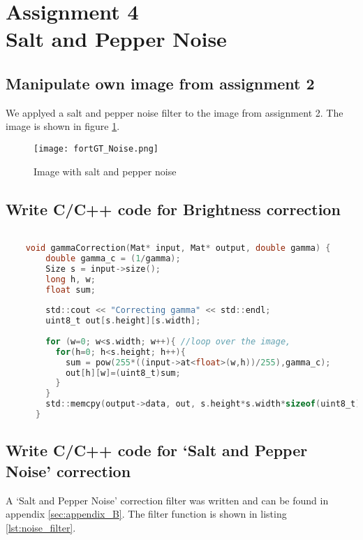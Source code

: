 \section {Assignment 4 \\ {Salt and Pepper Noise}}
\label {sec:assignment_4}

\subsection{Manipulate own image from assignment 2}

We applyed a salt and pepper noise filter to the image from assignment 2. The image is shown in figure \ref{fig:fortGT_Noise}.

\begin{figure}[h!]
    \centering
    \texttt{[image: fortGT\_Noise.png]}
    \caption{Image with salt and pepper noise}
    \label{fig:fortGT_Noise}
\end{figure}

\subsection{Write C/C++ code for Brightness correction}

\begin{lstlisting}[language=C, caption={Brightness correction}, label=lst:brightness_correction]

    void gammaCorrection(Mat* input, Mat* output, double gamma) {
        double gamma_c = (1/gamma);
        Size s = input->size();
        long h, w;
        float sum;
        
        std::cout << "Correcting gamma" << std::endl;
        uint8_t out[s.height][s.width];
        
        for (w=0; w<s.width; w++){ //loop over the image, 
          for(h=0; h<s.height; h++){
            sum = pow(255*((input->at<float>(w,h))/255),gamma_c);
            out[h][w]=(uint8_t)sum;
          }
        }
        std::memcpy(output->data, out, s.height*s.width*sizeof(uint8_t));
      }

\end{lstlisting}

\subsection{Write C/C++ code for ‘Salt and Pepper Noise’ correction}

A ‘Salt and Pepper Noise’ correction filter was written and can be found in appendix \ref{sec:appendix_B}. The filter function is shown in listing \ref{lst:noise_filter}.

